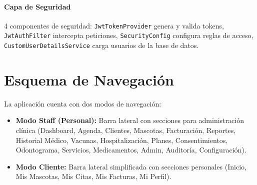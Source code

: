 \paragraph{Capa de Seguridad}
4 componentes de seguridad: \texttt{JwtTokenProvider} genera y valida tokens, \texttt{JwtAuthFilter} intercepta peticiones, \texttt{SecurityConfig} configura reglas de acceso, \texttt{CustomUserDetailsService} carga usuarios de la base de datos.

\section{Esquema de Navegaci\'on}

La aplicaci\'on cuenta con dos modos de navegaci\'on:

\begin{itemize}
    \item \textbf{Modo Staff (Personal):} Barra lateral con secciones para administraci\'on cl\'inica (Dashboard, Agenda, Clientes, Mascotas, Facturaci\'on, Reportes, Historial M\'edico, Vacunas, Hospitalizaci\'on, Planes, Consentimientos, Odontograma, Servicios, Medicamentos, Admin, Auditor\'ia, Configuraci\'on).
    \item \textbf{Modo Cliente:} Barra lateral simplificada con secciones personales (Inicio, Mis Mascotas, Mis Citas, Mis Facturas, Mi Perfil).
\end{itemize}
